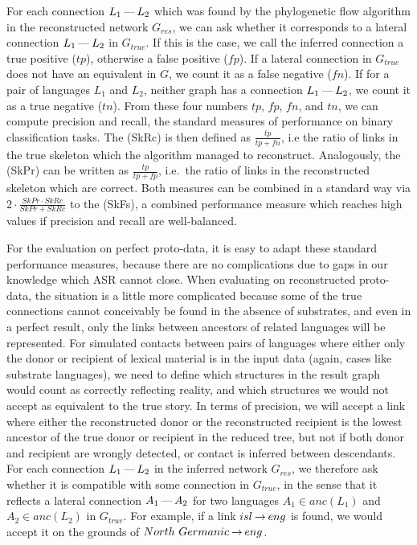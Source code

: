 For each connection $L_1 \kern 2pt\hbox{---}\kern 2pt L_2$ which was found by the phylogenetic flow algorithm in the reconstructed network $G_{res}$, we can ask whether it corresponds to a lateral connection $L_1 \kern 2pt\hbox{---}\kern 2pt L_2$ in $G_{true}$. If this is the case, we call the inferred connection a true positive ($tp$), otherwise a false positive ($fp$). If a lateral connection in $G_{true}$ does not have an equivalent in $G$, we count it as a false negative ($fn$). If for a pair of languages $L_1$ and $L_2$, neither graph has a connection $L_1 \kern 2pt\hbox{---}\kern 2pt L_2$, we count it as a true negative ($tn$). From these four numbers $tp$, $fp$, $fn$, and $tn$, we can compute precision and recall, the standard measures of performance on binary classification tasks. The \textit{} (SkRc) is then defined as $\frac{tp}{tp+fn}$, i.e the ratio of links in the true skeleton which the algorithm managed to reconstruct. Analogously, the \textit{} (SkPr) can be written as $\frac{tp}{tp+fp}$, i.e.\ the ratio of 
links in the reconstructed skeleton which are correct. Both measures can be combined in a standard way via $2 \cdot \frac{SkPr \cdot SkRc}{SkPr+SkRc}$ to the \textit{} (SkFs), a combined performance measure which reaches high values if precision and recall are well-balanced.

For the evaluation on perfect proto-data, it is easy to adapt these standard performance measures, because there are no complications due to gaps in our knowledge which ASR cannot close. When evaluating on reconstructed proto-data, the situation is a little more complicated because some of the true connections cannot conceivably be found in the absence of substrates, and even in a perfect result, only the links between ancestors of related languages will be represented. For simulated contacts between pairs of languages where either only the donor or recipient of lexical material is in the input data (again, cases like substrate languages), we need to define which structures in the result graph would count as correctly reflecting reality, and which structures we would not accept as equivalent to the true story. In terms of precision, we will accept a link where either the reconstructed donor or the reconstructed recipient is the lowest ancestor of the true donor or recipient in the reduced tree, but not if 
both donor and recipient are wrongly detected, or contact is inferred between descendants. For each connection $L_1 \kern 2pt\hbox{---}\kern 2pt L_2$ in the inferred network $G_{res}$, we therefore ask whether it is compatible with some connection in $G_{true}$, in the sense that it reflects a lateral connection $A_1 \kern 2pt\hbox{---}\kern 2pt A_2$ for two languages $A_1 \in anc(L_1)$ and $A_2 \in anc(L_2)$ in $G_{true}$. For example, if a link $isl \kern 2pt\hbox{$\rightarrow$}\kern 2pt eng$ is found, we would accept it on the grounds of $North\ Germanic \kern 2pt\hbox{$\rightarrow$}\kern 2pt eng$.

